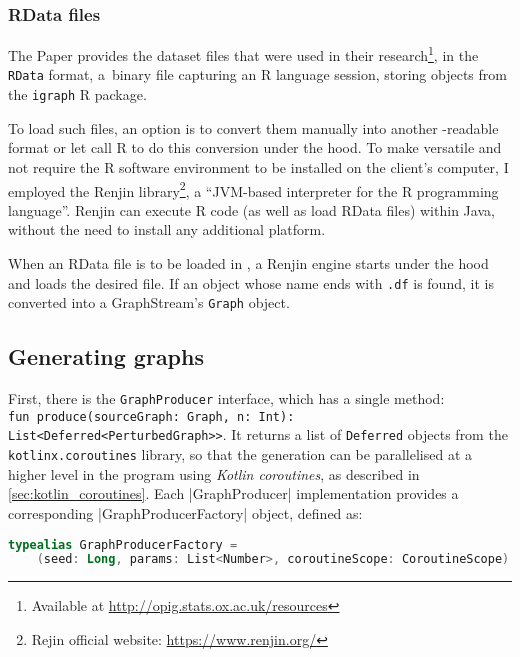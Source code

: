 \subsubsection*{RData files}\label{sec:rdata_files}

The Paper provides the dataset files that were used in their research\footnote{Available at \url{http://opig.stats.ox.ac.uk/resources}}, in the \texttt{RData} format, a~binary file capturing an R language session, storing objects from the \texttt{igraph} R package.

To load such files, an option is to convert them manually into another \graffs-readable format or let \graffs call R to do this conversion under the hood.
To make \graffs versatile and not require the R software environment to be installed on the client's computer, I employed the Renjin library\footnote{Rejin official website: \url{https://www.renjin.org/}}, a \enquote{JVM-based interpreter for the R programming language}.
Renjin can execute R code (as well as load RData files) within Java, without the need to install any additional platform.

When an RData file is to be loaded in \graffs, a Renjin engine starts under the hood and loads the desired file.
If an object whose name ends with \texttt{.df}\footnotemark{} is found, it is converted into a GraphStream's \texttt{Graph} object.

\subsection{Generating graphs}

First, there is the \texttt{GraphProducer} interface, which has a single method:\\ \texttt{fun produce(sourceGraph: Graph, n: Int): List<Deferred<PerturbedGraph>>}.
It returns a list of \texttt{Deferred} objects from the \texttt{kotlinx.coroutines} library, so that the generation can be parallelised at a higher level in the program using \textsl{Kotlin coroutines}, as described in \autoref{sec:kotlin_coroutines}.
Each |GraphProducer| implementation provides a corresponding |GraphProducerFactory| object, defined as:

\begin{lstlisting}[language=Kotlin]
typealias GraphProducerFactory =
    (seed: Long, params: List<Number>, coroutineScope: CoroutineScope) -> GraphProducer
\end{lstlisting}

